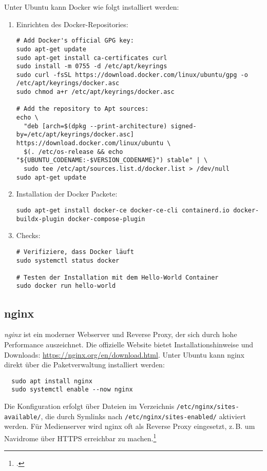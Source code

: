 \documentclass[12pt,a4paper]{report}
\begin{document}
  Unter Ubuntu kann Docker wie folgt installiert werden:  

  \begin{enumerate}
    \item Einrichten des Docker-Repositories:
    \begin{verbatim}
# Add Docker's official GPG key:
sudo apt-get update
sudo apt-get install ca-certificates curl
sudo install -m 0755 -d /etc/apt/keyrings
sudo curl -fsSL https://download.docker.com/linux/ubuntu/gpg -o /etc/apt/keyrings/docker.asc
sudo chmod a+r /etc/apt/keyrings/docker.asc

# Add the repository to Apt sources:
echo \
  "deb [arch=$(dpkg --print-architecture) signed-by=/etc/apt/keyrings/docker.asc] https://download.docker.com/linux/ubuntu \
  $(. /etc/os-release && echo "${UBUNTU_CODENAME:-$VERSION_CODENAME}") stable" | \
  sudo tee /etc/apt/sources.list.d/docker.list > /dev/null
sudo apt-get update
    \end{verbatim} 

    \item Installation der Docker Packete:
    \begin{verbatim}
sudo apt-get install docker-ce docker-ce-cli containerd.io docker-buildx-plugin docker-compose-plugin
    \end{verbatim}

    \item Checks:
    \begin{verbatim}
# Verifiziere, dass Docker läuft
sudo systemctl status docker

# Testen der Installation mit dem Hello-World Container
sudo docker run hello-world
    \end{verbatim} 
  \end{enumerate}

  \subsection{nginx}  
  \emph{nginx} ist ein moderner Webserver und Reverse Proxy, der sich durch hohe Performance auszeichnet.  
  Die offizielle Website bietet Installationshinweise und Downloads: \url{https://nginx.org/en/download.html}.  
  Unter Ubuntu kann nginx direkt über die Paketverwaltung installiert werden:  
  \begin{verbatim}
  sudo apt install nginx
  sudo systemctl enable --now nginx
  \end{verbatim}  
  Die Konfiguration erfolgt über Dateien im Verzeichnis \texttt{/etc/nginx/sites-available/}, die durch Symlinks nach \texttt{/etc/nginx/sites-enabled/} aktiviert werden.  
  Für Medienserver wird nginx oft als Reverse Proxy eingesetzt, z.\,B. um Navidrome über HTTPS erreichbar zu machen.\footcite[Vgl.][Kapitel~11, S.~365~ff.]{nemeth_unixlinux}  
\end{document}
